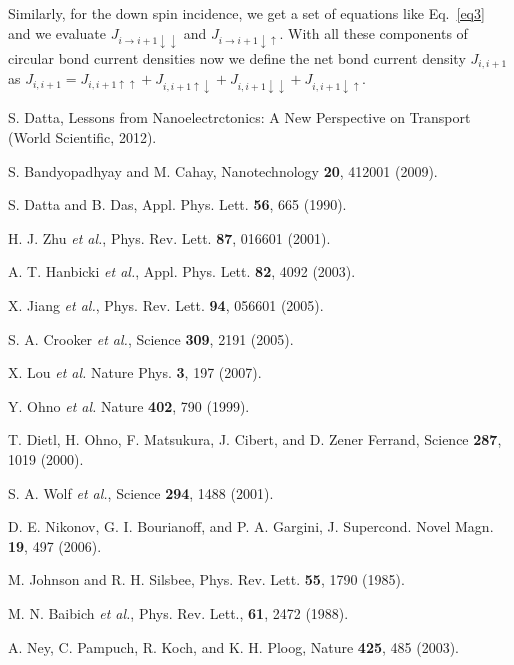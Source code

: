 \documentclass[prb,aps,twocolumn,amsmath,amssymb,floatfix,superscriptaddress]{revtex4}
\begin{document}
{Similarly, for the down spin incidence, we get a set of equations like
Eq.~\ref{eq3} and we evaluate $J_{i\rightarrow i+1\downarrow\downarrow}$ and 
$J_{i\rightarrow i+1\downarrow\uparrow}$. With all these components of circular bond current
densities now we define the net bond current density $J_{i,i+1}$ as $J_{i,i+1} =
J_{i,i+1\uparrow\uparrow} + J_{i,i+1\uparrow\downarrow} +
J_{i,i+1\downarrow\downarrow} + J_{i, i+1\downarrow\uparrow}$.

\begin{thebibliography}{99}

 S. Datta, Lessons from Nanoelectrctonics: A New Perspective
on Transport (World Scientific, 2012).

 S. Bandyopadhyay and M. Cahay, Nanotechnology \textbf{20}, 412001
(2009).

 S. Datta and B. Das, Appl. Phys. Lett. \textbf{56}, 665 (1990).

 H. J. Zhu {\it et al.}, Phys. Rev. Lett.
\textbf{87}, 016601 (2001).

 A. T. Hanbicki {\it et al.}, Appl. Phys. Lett. \textbf{82},
4092 (2003).

 X. Jiang {\it et al.}, Phys. Rev. Lett. \textbf{94}, 056601 (2005).

 S. A. Crooker {\it et al.}, Science \textbf{309}, 2191 (2005).

 X. Lou {\it et al.} Nature Phys. \textbf{3}, 197 (2007).

 Y. Ohno {\it et al.} Nature \textbf{402}, 790 (1999).

 T. Dietl, H. Ohno, F. Matsukura, J. Cibert, and D. Zener Ferrand,
Science \textbf{287}, 1019 (2000).


 S. A. Wolf {\it et al.}, Science \textbf{294}, 1488 (2001).

 D. E. Nikonov, G. I. Bourianoff, and P. A. Gargini, J. Supercond. Novel
Magn. \textbf{19}, 497 (2006).

 M. Johnson and R. H. Silsbee, Phys. Rev. Lett. \textbf{55}, 1790 (1985).

 M. N. Baibich {\it et al.}, Phys. Rev. Lett., \textbf{61}, 2472 (1988).

 A. Ney, C. Pampuch, R. Koch, and K. H. Ploog, Nature \textbf{425}, 485 (2003).


\end{thebibliography}}
\end{document}
